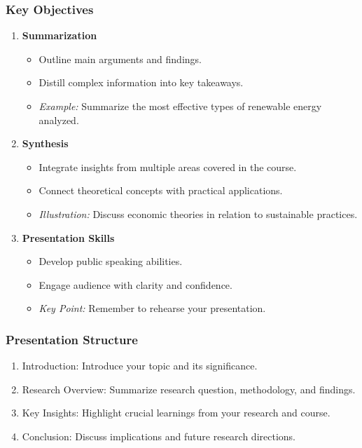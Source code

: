 \documentclass[aspectratio=169]{beamer}
\begin{document}
\begin{frame}[fragile]
    \frametitle{Key Objectives}
    \begin{enumerate}
        \item \textbf{Summarization}
        \begin{itemize}
            \item Outline main arguments and findings.
            \item Distill complex information into key takeaways.
            \item \textit{Example:} Summarize the most effective types of renewable energy analyzed.
        \end{itemize}
        
        \item \textbf{Synthesis}
        \begin{itemize}
            \item Integrate insights from multiple areas covered in the course.
            \item Connect theoretical concepts with practical applications.
            \item \textit{Illustration:} Discuss economic theories in relation to sustainable practices.
        \end{itemize}
        
        \item \textbf{Presentation Skills}
        \begin{itemize}
            \item Develop public speaking abilities.
            \item Engage audience with clarity and confidence.
            \item \textit{Key Point:} Remember to rehearse your presentation.
        \end{itemize}
    \end{enumerate}
\end{frame}

\begin{frame}[fragile]
    \frametitle{Presentation Structure}
    \begin{enumerate}
        \item Introduction: Introduce your topic and its significance.
        \item Research Overview: Summarize research question, methodology, and findings.
        \item Key Insights: Highlight crucial learnings from your research and course.
        \item Conclusion: Discuss implications and future research directions.
    \end{enumerate}
\end{frame}
\end{document}

